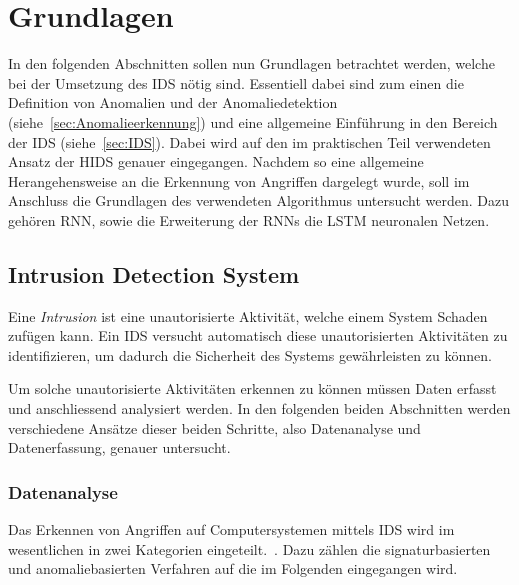 
\chapter{Grundlagen}\label{ch:Grundlagen}
In den folgenden Abschnitten sollen nun Grundlagen betrachtet werden, welche bei der Umsetzung des \ac{IDS} nötig sind.
    Essentiell dabei sind zum einen die Definition von Anomalien und der Anomaliedetektion (siehe~\autoref{sec:Anomalieerkennung})
    und eine allgemeine Einführung in den Bereich der \ac{IDS} (siehe~\autoref{sec:IDS}).
    Dabei wird auf den im praktischen Teil verwendeten Ansatz der \ac{HIDS} genauer eingegangen.
    Nachdem so eine allgemeine Herangehensweise an die Erkennung von Angriffen dargelegt wurde, 
    soll im Anschluss die Grundlagen des verwendeten Algorithmus untersucht werden.
    Dazu gehören \ac{RNN}, sowie die Erweiterung der \ac{RNN}s die \ac{LSTM} neuronalen Netzen.

    \section{Intrusion Detection System}\label{sec:IDS}
        Eine \textit{Intrusion}  ist eine unautorisierte Aktivität, welche einem System Schaden zufügen kann.
        Ein \ac{IDS} versucht automatisch diese unautorisierten Aktivitäten zu identifizieren, um dadurch die Sicherheit des Systems gewährleisten zu können.~\cite{IDSreview}
        
        Um solche unautorisierte Aktivitäten erkennen zu können müssen Daten erfasst und anschliessend analysiert werden.
        In den folgenden beiden Abschnitten werden verschiedene Ansätze dieser beiden Schritte, also Datenanalyse und Datenerfassung, genauer untersucht.

        \subsection{Datenanalyse}\label{sec:Datenanalyse}
        Das Erkennen von Angriffen auf Computersystemen mittels \ac{IDS} wird im wesentlichen in zwei Kategorien eingeteilt.~\cite{IDSreview, IDSsurvey, IDSsurvey2}.
            Dazu zählen die signaturbasierten und anomaliebasierten Verfahren auf die im Folgenden eingegangen wird.

